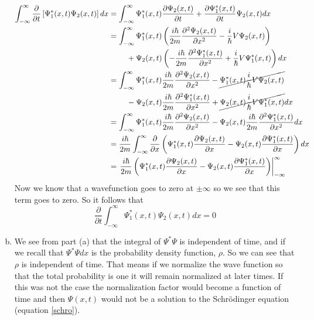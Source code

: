 \documentclass[11pt]{article}
\numberwithin{equation}{section}
\begin{document}
\begin{enumerate}[(a)]
\begin{align*}
\int_{-\infty}^{\infty}\frac{\partial}{\partial t}\left[\Psi_1^*(x,t)\Psi_2(x,t)\right]dx &= \int_{-\infty}^{\infty}\Psi_1^*(x,t)\frac{\partial\Psi_2(x,t)}{\partial t} +\frac{\partial\Psi_1^*(x,t)}{\partial t}\Psi_2(x,t)dx\\
&= \int_{-\infty}^{\infty}\Psi_1^*(x,t)\left(\frac{i\hbar}{2m}\frac{\partial^2\Psi_2(x,t)}{\partial x^2} - \frac{i}{\hbar}V\Psi_2(x,t)\right) \\
& \ \ \ \ \ \ \ + \Psi_2(x,t)\left(-\frac{i\hbar}{2m}\frac{\partial^2\Psi_1^*(x,t)}{\partial x^2} + \frac{i}{\hbar}V\Psi_1^*(x,t)\right)dx\\
&= \int_{-\infty}^{\infty}\Psi_1^*(x,t)\frac{i\hbar}{2m}\frac{\partial^2\Psi_2(x,t)}{\partial x^2} - \cancel{\Psi_1^*(x,t)\frac{i}{\hbar}V\Psi_2(x,t)} \\
& \ \ \ \ \ \ \ - \Psi_2(x,t)\frac{i\hbar}{2m}\frac{\partial^2\Psi_1^*(x,t)}{\partial x^2} + \cancel{\Psi_2(x,t)\frac{i}{\hbar}V\Psi_1^*(x,t)}dx\\
&= \int_{-\infty}^{\infty}\Psi_1^*(x,t)\frac{i\hbar}{2m}\frac{\partial^2\Psi_2(x,t)}{\partial x^2} - \Psi_2(x,t)\frac{i\hbar}{2m}\frac{\partial^2\Psi_1^*(x,t)}{\partial x^2}dx\\
&= \frac{i\hbar}{2m}\int_{-\infty}^{\infty}\frac{\partial}{\partial x}\left(\Psi_1^*(x,t)\frac{\partial\Psi_2(x,t)}{\partial x} - \Psi_2(x,t)\frac{\partial\Psi_1^*(x,t)}{\partial x}\right)dx\\
&= \left.\frac{i\hbar}{2m}\left(\Psi_1^*(x,t)\frac{\partial\Psi_2(x,t)}{\partial x} - \Psi_2(x,t)\frac{\partial\Psi_1^*(x,t)}{\partial x}\right)\right|_{-\infty}^{\infty}
\end{align*}
Now we know that a wavefunction goes to zero at $\pm\infty$ so we see that this term goes to zero. So it follows that
$$\frac{\partial}{\partial t}\int_{-\infty}^{\infty}\Psi_1^*(x,t)\Psi_2(x,t)dx = 0$$

\item
We see from part (a) that the integral of $\Psi^*\Psi$ is independent of time, and if we recall that $\Psi^*\Psi dx$ is the probability density function, $\rho$. So we can see that $\rho$ is independent of time. That means if we normalize the wave function so that the total probability is one it will remain normalized at later times. If this was not the case the normalization factor would become a function of time and then $\Psi(x,t)$ would not be a solution to the Schr\"{o}dinger equation (equation \ref{schro}).


\end{enumerate}
\end{document}
